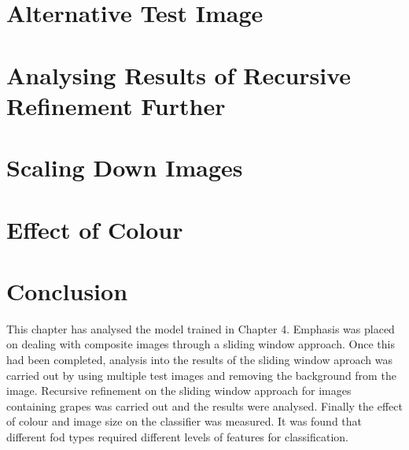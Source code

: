 \section{Alternative Test Image}
\label{alternative}


\section{Analysing Results of Recursive Refinement Further}
\label{rrAnalyse}


\section{Scaling Down Images}
\label{scale}


\section{Effect of Colour}
\label{colour}


\section{Conclusion}
This chapter has analysed the model trained in Chapter 4.
Emphasis was placed on dealing with composite images through a sliding window approach.
Once this had been completed, analysis into the results of the sliding window aproach was carried out by using multiple test images and removing the background from the image.
Recursive refinement on the sliding window approach for images containing grapes was carried out and the results were analysed.
Finally the effect of colour and image size on the classifier was measured.
It was found that different fod types required different levels of features for classification.
% 

